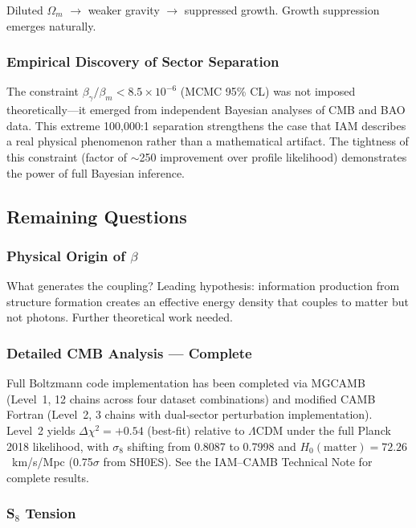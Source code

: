 \documentclass[11pt,letterpaper]{article}
\begin{document}
\noindent Diluted $\Omega_m$ $\rightarrow$ weaker gravity $\rightarrow$ suppressed growth. Growth suppression emerges naturally.

\subsubsection{Empirical Discovery of Sector Separation}

The constraint $\beta_\gamma/\beta_m < 8.5 \times 10^{-6}$ (MCMC 95\% CL) was not imposed theoretically---it emerged from independent Bayesian analyses of CMB and BAO data. This extreme 100,000:1 separation strengthens the case that IAM describes a real physical phenomenon rather than a mathematical artifact. The tightness of this constraint (factor of $\sim$250 improvement over profile likelihood) demonstrates the power of full Bayesian inference.

\subsection{Remaining Questions}

\subsubsection{Physical Origin of $\beta$}

What generates the coupling? Leading hypothesis: information production from structure formation creates an effective energy density that couples to matter but not photons. Further theoretical work needed.

\subsubsection{Detailed CMB Analysis --- Complete}

Full Boltzmann code implementation has been completed via MGCAMB (Level~1, 12 chains across four dataset combinations) and modified CAMB Fortran (Level~2, 3 chains with dual-sector perturbation implementation). Level~2 yields $\Delta\chi^2 = +0.54$ (best-fit) relative to $\Lambda$CDM under the full Planck 2018 likelihood, with $\sigma_8$ shifting from 0.8087 to 0.7998 and $H_0(\mathrm{matter}) = 72.26$~km/s/Mpc (0.75$\sigma$ from SH0ES). See the IAM--CAMB Technical Note for complete results.

\subsubsection{S$_8$ Tension}
\end{document}
